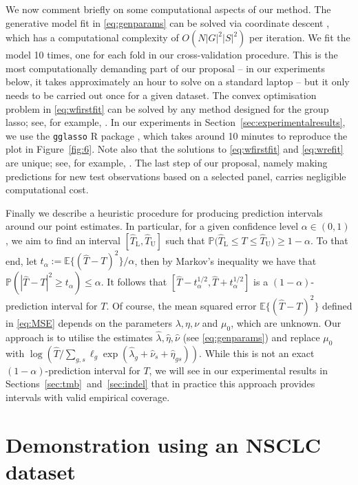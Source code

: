\documentclass[../thesis.tex]{subfiles}
\begin{document}
We now comment briefly on some computational aspects of our method. The generative model fit in \eqref{eq:genparams} can be solved via coordinate descent \citep[see, for example,][]{friedman_regularization_2010}, which has a computational complexity of $O(N|G|^2|S|^2)$ per iteration.  We fit the model 10 times, one for each fold in our cross-validation procedure. This is the most computationally demanding part of our proposal -- in our experiments below, it takes approximately an hour to solve on a standard laptop -- but it only needs to be carried out once for a given dataset.  The convex optimisation problem in \eqref{eq:wfirstfit} can be solved by any method designed for the group \gls{lasso}; see, for example, \citet{yang_fast_2015}. In our experiments in Section~\ref{sec:experimentalresults}, we use the \texttt{gglasso} R package \citep{yang_gglasso_2020}, which takes around 10 minutes to reproduce the plot in Figure~\ref{fig:6}. Note also that the solutions to \eqref{eq:wfirstfit} and \eqref{eq:wrefit} are unique; see, for example, \citet[Theorem~1]{roth_group-lasso_2008}.  The last step of our proposal, namely making predictions for new test observations based on a selected panel, carries negligible computational cost.  

Finally we describe a heuristic procedure for producing prediction intervals around our point estimates.  In particular, for a given confidence level $\alpha \in (0,1)$, we aim to find an interval $[\hat{T}_{\mathrm{L}}, \hat{T}_{\mathrm{U}}]$ such that $\mathbb{P}\bigl(\hat{T}_{\mathrm{L}} \leq T \leq \hat{T}_{\mathrm{U}}\bigr) \geq 1- \alpha.$  To that end, let $t_\alpha := \mathbb{E}\{(\hat{T} - T)^2\}/\alpha$, then by Markov's inequality we have that $\mathbb{P}(|\hat{T} - T|^2 \geq t_\alpha) \leq \alpha$. It follows that $[\hat{T} - t_\alpha^{1/2} , \hat{T}+ t_\alpha^{1/2}]$ is a $(1-\alpha)$-prediction interval for $T$. Of course, the mean squared error $\mathbb{E}\{(\hat{T}-T)^2\}$ defined in \eqref{eq:MSE} depends on the parameters $\lambda, \eta, \nu$ and $\mu_0$, which are unknown.  Our approach is to utilise the estimates $\hat{\lambda}, \hat{\eta}, \hat{\nu}$ (see \eqref{eq:genparams}) and replace $\mu_0$ with $\log(\hat{T}/\sum_{g,s}\ell_g\exp(\hat{\lambda}_g + \hat{\nu}_s + \hat{\eta}_{gs}))$. While this is not an exact $(1-\alpha)$-prediction interval for $T$,  we will see in our experimental results in Sections~\ref{sec:tmb}~and~\ref{sec:indel} that in practice this approach provides intervals with valid empirical coverage.  

\section{Demonstration using an NSCLC dataset \label{sec:experimentalresults}}
\end{document}
